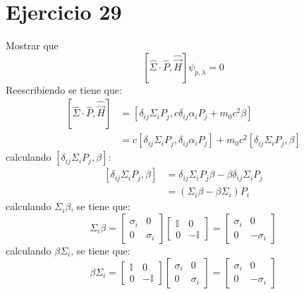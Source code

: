 \section*{Ejercicio 29}
Mostrar que 
\begin{equation*}
    \left[\hat{\Sigma}\cdot \hat{P}, \hat{\vec{H}}\right] \psi_{p,\lambda} = 0
\end{equation*}
Reescribiendo se tiene que:
\begin{align*}
    \left[\hat{\Sigma}\cdot \hat{P}, \hat{\vec{H}}\right]&=\left[\delta_{ij} \Sigma_iP_j , c\delta_{ij}\alpha_iP_j+m_0c^2\beta\right]\\
    &= c \left[\delta_{ij} \Sigma_iP_j,\delta_{ij}\alpha_iP_j\right]+m_0c^2\left[\delta_{ij} \Sigma_iP_j,\beta\right]
\end{align*}
calculando $\left[\delta_{ij} \Sigma_iP_j,\beta\right]$:
\begin{align*}
    \left[\delta_{ij} \Sigma_iP_j,\beta\right] & =\delta_{ij} \Sigma_iP_j\beta -\beta \delta_{ij} \Sigma_iP_j \\
    &=\left(\Sigma_i\beta - \beta \Sigma_i\right) P_i
\end{align*}
calculando $\Sigma_i \beta $, se tiene que:
\begin{equation*}
    \Sigma_i \beta = \left[\begin{matrix}
        \sigma_i &0 \\
        0 & \sigma_i 
    \end{matrix}\right]\left[\begin{matrix}
        \mathbb{I} & 0\\
        0 & -\mathbb{I}
    \end{matrix}\right] = \left[\begin{matrix}
        \sigma_i &0 \\
        0 & -\sigma_i 
    \end{matrix}\right]
\end{equation*}
calculando $\beta\Sigma_i $, se tiene que:
\begin{equation*}
    \beta \Sigma_i =\left[\begin{matrix}
        \mathbb{I} & 0\\
        0 & -\mathbb{I}
    \end{matrix}\right]
     \left[\begin{matrix}
        \sigma_i &0 \\
        0 & \sigma_i 
    \end{matrix}\right] = \left[\begin{matrix}
        \sigma_i &0 \\
        0 & -\sigma_i 
    \end{matrix}\right]
\end{equation*}

